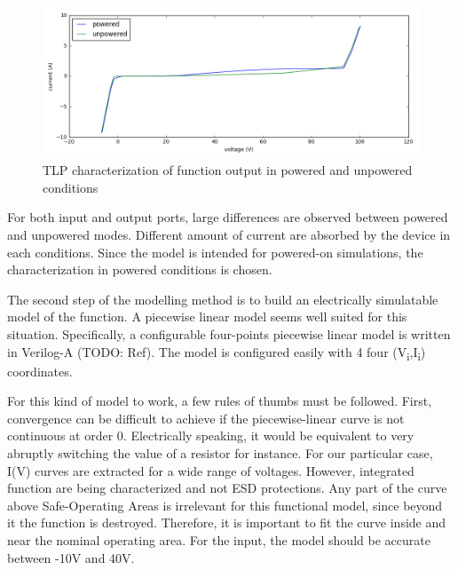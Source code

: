 \begin{figure}[!h]
  \centering
  \includegraphics[width=\textwidth]{src/4/figures/tlp_output_characterization.png}
  \caption{TLP characterization of function output in powered and unpowered conditions}
  \label{fig:tlp-output-cz}
\end{figure}

For both input and output ports, large differences are observed between powered and unpowered modes.
Different amount of current are absorbed by the device in each conditions.
Since the model is intended for powered-on simulations, the characterization in powered conditions is chosen.

The second step of the modelling method is to build an electrically simulatable model of the function.
A piecewise linear model seems well suited for this situation.
Specifically, a configurable four-points piecewise linear model is written in Verilog-A (TODO: Ref).
The model is configured easily with 4 four (V\textsubscript{i},I\textsubscript{i}) coordinates.

\lstset{style=veriloga-style}


For this kind of model to work, a few rules of thumbs must be followed.
First, convergence can be difficult to achieve if the piecewise-linear curve is not continuous at order 0.
Electrically speaking, it would be equivalent to very abruptly switching the value of a resistor for instance.
For our particular case, I(V) curves are extracted for a wide range of voltages.
However, integrated function are being characterized and not ESD protections.
Any part of the curve above Safe-Operating Areas is irrelevant for this functional model, since beyond it the function is destroyed.
Therefore, it is important to fit the curve inside and near the nominal operating area.
For the input, the model should be accurate between -10V and 40V.

